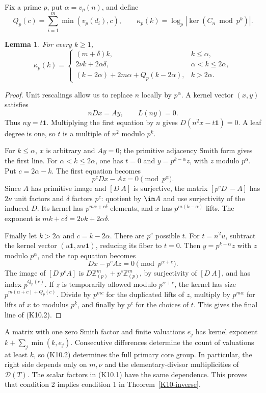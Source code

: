\documentclass[11pt,a4paper]{article}
\newtheorem{lemma}[theorem]{Lemma}
\theoremstyle{definition}\newtheorem{definition}[theorem]{Definition}
\theoremstyle{remark}\newtheorem{remark}[theorem]{Remark}
\newcommand{\Z}{\mathbb Z}\newcommand{\Q}{\mathbb Q}\newcommand{\F}{\mathbb F}
\numberwithin{equation}{section}
\begin{document}
Fix a prime $p$, put $\alpha=v_p(n)$, and define
\[
 Q_p(c)=\sum_{i=1}^m\min(v_p(d_i),c),\qquad
 \kappa_p(k)=\log_p|\ker(C_n\bmod p^k)|.
\]
\begin{lemma}\label{K10-counts}
For every $k\geq1$,
\[
 \kappa_p(k)=
 \begin{cases}
 (m+\delta)k,&k\leq\alpha,\\
 2\nu k+2\alpha\delta,&\alpha<k\leq2\alpha,\\
 (k-2\alpha)+2m\alpha+Q_p(k-2\alpha),&k>2\alpha.
 \end{cases}                                                 \tag{K10.2}
\]
\end{lemma}
\begin{proof}
Unit rescalings allow us to replace $n$ locally by $p^\alpha$. A kernel vector $(x,y)$ satisfies
\[
 nDx=Ay,\qquad L(ny)=0.
\]
Thus $ny=t\boldsymbol1$. Multiplying the first equation by $n$ gives $D(n^2x-t\boldsymbol1)=0$. A leaf degree is one, so $t$ is a multiple of $n^2$ modulo $p^k$.

For $k\leq\alpha$, $x$ is arbitrary and $Ay=0$; the primitive adjacency Smith form gives the first line. For $\alpha<k\leq2\alpha$, one has $t=0$ and $y=p^{k-\alpha}z$, with $z$ modulo $p^\alpha$. Put $c=2\alpha-k$. The first equation becomes
\[
 p^cDx-Az=0\pmod{p^\alpha}.
\]
Since $A$ has primitive image and $[D\ A]$ is surjective, the matrix $[p^cD\ -A]$ has $2\nu$ unit factors and $\delta$ factors $p^c$: quotient by $\im A$ and use surjectivity of the induced $D$. Its kernel has $p^{m\alpha+c\delta}$ elements, and $x$ has $p^{m(k-\alpha)}$ lifts. The exponent is $mk+c\delta=2\nu k+2\alpha\delta$.

Finally let $k>2\alpha$ and $c=k-2\alpha$. There are $p^c$ possible $t$. For $t=n^2u$, subtract the kernel vector $(u\boldsymbol1,nu\boldsymbol1)$, reducing its fiber to $t=0$. Then $y=p^{k-\alpha}z$ with $z$ modulo $p^\alpha$, and the top equation becomes
\[
 Dx-p^cAz=0\pmod{p^{\alpha+c}}.
\]
The image of $[D\ p^cA]$ is $D\Z_{(p)}^m+p^c\Z_{(p)}^m$, by surjectivity of $[D\ A]$, and has index $p^{Q_p(c)}$. If $z$ is temporarily allowed modulo $p^{\alpha+c}$, the kernel has size $p^{m(\alpha+c)+Q_p(c)}$. Divide by $p^{mc}$ for the duplicated lifts of $z$, multiply by $p^{m\alpha}$ for lifts of $x$ to modulus $p^k$, and finally by $p^c$ for the choices of $t$. This gives the final line of (K10.2).
\end{proof}
A matrix with one zero Smith factor and finite valuations $e_j$ has kernel exponent $k+\sum_j\min(k,e_j)$. Consecutive differences determine the count of valuations at least $k$, so (K10.2) determines the full primary core group. In particular, the right side depends only on $m,\nu$ and the elementary-divisor multiplicities of $\mathcal D(T)$. The scalar factors in (K10.1) have the same dependence. This proves that condition 2 implies condition 1 in Theorem~\ref{K10-inverse}.
\end{document}
